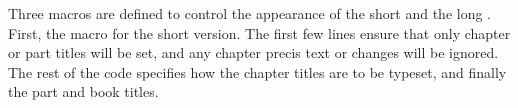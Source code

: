 \begin{lcode}
\setpnumwidth{2.55em}
\setrmarg{3.55em}
\renewcommand{\cftsectiondotsep}{\cftnodots}
\renewcommand{\cftsubsectiondotsep}{\cftnodots}
\renewcommand{\cftsubsubsectiondotsep}{\cftnodots}
\renewcommand{\cftparagraphdotsep}{\cftnodots}
\renewcommand{\cftsubparagraphdotsep}{\cftnodots}
\renewcommand{\cftfiguredotsep}{\cftnodots}
\renewcommand{\cfttabledotsep}{\cftnodots}
\end{lcode}

Three macros are defined to control the appearance of the short and 
the long \toc. First, the macro \cmd{\setupshorttoc} for the short 
version.
The first few lines ensure that only chapter or part titles will be set,
and any chapter precis text or  changes will be ignored.
The rest of the code specifies how the chapter titles are to be typeset,
and finally the part and book titles.
\begin{lcode}
\newcommand*{\setupshorttoc}{%
  \renewcommand*{\contentsname}{Short contents}
  \let\oldchangetocdepth\changetocdepth
  \renewcommand*{\changetocdepth}[1]{}
  \let\oldprecistoctext\precistoctext
  \renewcommand{\precistoctext}[1]{}
  \let\oldcftchapterfillnum\cftchapterfillnum
  \setcounter{tocdepth}{0}%
  \renewcommand*{\cftchapterfont}{\hfill\sffamily}
  \renewcommand*{\cftchapterleader}{ \textperiodcentered\space}
  \renewcommand*{\cftchapterafterpnum}{\cftparfillskip}
  \renewcommand*{\cftchapterfillnum}[1]{%
    {\cftchapterleader}\nobreak
    \hbox to 1.5em{\cftchapterpagefont ##1\hfil}\cftchapterafterpnum\par}
  \setrmarg{0.3\textwidth}
  \setlength{\unitlength}{\@tocrmarg}
  \addtolength{\unitlength}{1.5em}
  \let\oldcftpartformatpnum\cftpartformatpnum
  \renewcommand*{\cftpartformatpnum}[1]{%
    \hbox to\unitlength{{\cftpartpagefont ##1}}}}
  \let\oldcftbookformatpnum\cftbookformatpnum
  \renewcommand*{\cftbookformatpnum}[1]{%
    \hbox to\unitlength{{\cftbookpagefont ##1}}}}
\end{lcode}

